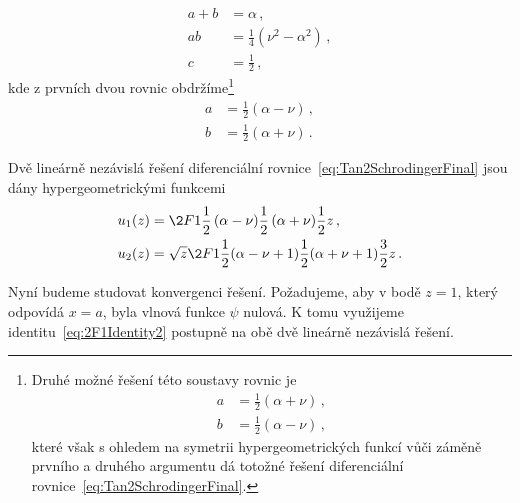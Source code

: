 \begin{solution}
\begin{enumerate}
		\begin{subequations}
			\begin{align}
				a+b&=\alpha\,,\\
				ab&=\frac{1}{4}\left(\nu^{2}-\alpha^{2}\right)\,,\\
				c&=\frac{1}{2}\,,
			\end{align}				
		\end{subequations}
		kde z prvních dvou rovnic obdržíme\footnote{
			Druhé možné řešení této soustavy rovnic je
			\begin{subequations}
				\begin{align}
					a&=\frac{1}{2}\left(\alpha+\nu\right)\,,\\
					b&=\frac{1}{2}\left(\alpha-\nu\right)\,,
				\end{align}					
			\end{subequations}
			které však s ohledem na symetrii hypergeometrických funkcí vůči záměně prvního
			a druhého argumentu dá totožné řešení diferenciální rovnice~\eqref{eq:Tan2SchrodingerFinal}.
		}
		\begin{subequations}
			\begin{align}
				a&=\frac{1}{2}\left(\alpha-\nu\right)\,,\\
				b&=\frac{1}{2}\left(\alpha+\nu\right)\,.
			\end{align}				
		\end{subequations}
	\end{enumerate}
	
	Dvě lineárně nezávislá řešení diferenciální rovnice~\eqref{eq:Tan2SchrodingerFinal} jsou
	dány hypergeometrickými funkcemi
	\begin{subequations}
		\begin{align}
			u_{1}(z)
				&=\2F1{\frac{1}{2}\left(\alpha-\nu\right)}{\frac{1}{2}\left(\alpha+\nu\right)}
					{\frac{1}{2}}{z}\,,\\
			u_{2}(z)
				&=\sqrt{z}\2F1{\frac{1}{2}(\alpha-\nu+1)}{\frac{1}{2}(\alpha+\nu+1)}{\frac{3}{2}}{z}\,.
		\end{align}			
	\end{subequations}
	
	Nyní budeme studovat konvergenci řešení.
	Požadujeme, aby v bodě $z=1$, který odpovídá $x=a$, byla vlnová funkce $\psi$ nulová.
	K tomu využijeme identitu~\eqref{eq:2F1Identity2} postupně na obě dvě lineárně nezávislá řešení.
	

\end{solution}
